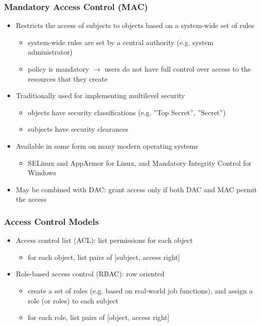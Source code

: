 \documentclass[final]{article}
\begin{document}
\subsubsection*{Mandatory Access Control (MAC)}
\begin{itemize}[nosep]
    \item Restricts the access of subjects to objects based on a system-wide set of rules
          \begin{itemize}[nosep]
              \item system-wide rules are set by a central authority (e.g. system administrator)
              \item policy is mandatory $\rightarrow$ users do not have full control over access to the resources that they create
          \end{itemize}
    \item Traditionally used for implementing multilevel security
          \begin{itemize}[nosep]
              \item objects have security classifications (e.g. ''Top Secret'', ''Secret'')
              \item subjects have security clearances
          \end{itemize}
    \item Available in some form on many modern operating systems
          \begin{itemize}[nosep]
              \item SELinux and AppArmor for Linux, and Mandatory Integrity Control for Windows
          \end{itemize}
    \item May be combined with DAC: grant access only if both DAC and MAC permit the access
\end{itemize}
\subsubsection*{Access Control Models}
\begin{itemize}[nosep]
    \item Access control list (ACL): list permissions for each object
          \begin{itemize}[nosep]
              \item for each object, list pairs of [subject, access right]
          \end{itemize}
    \item Role-based access control (RBAC): row oriented
          \begin{itemize}[nosep]
              \item create a set of roles (e.g. based on real-world job functions), and assign a role (or roles) to each subject
              \item for each role, list pairs of [object, access right]
          \end{itemize}
\end{itemize}
\end{document}
